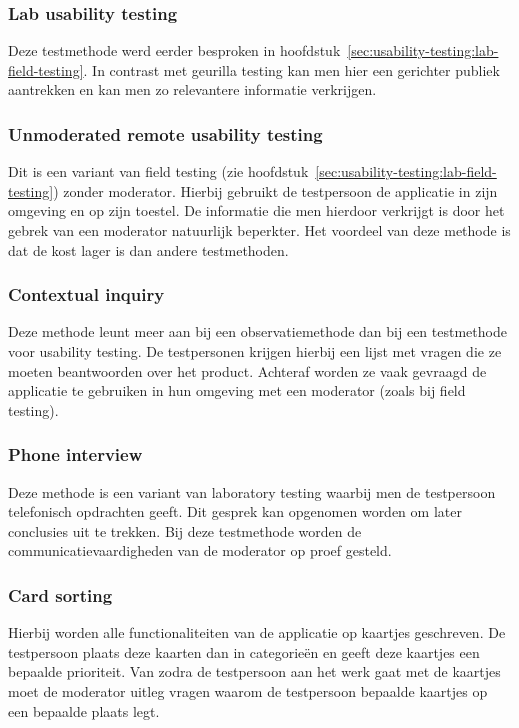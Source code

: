\subsubsection{Lab usability testing}
\label{sec:usability-testing:testmethoden:lab}

Deze testmethode werd eerder besproken in hoofdstuk~\ref{sec:usability-testing:lab-field-testing}. In contrast met geurilla testing kan men hier een gerichter publiek aantrekken en kan men zo relevantere informatie verkrijgen.

\subsubsection{Unmoderated remote usability testing}
\label{sec:usability-testing:testmethoden:unmoderated-remote}

Dit is een variant van field testing (zie hoofdstuk~\ref{sec:usability-testing:lab-field-testing}) zonder moderator. Hierbij gebruikt de testpersoon de applicatie in zijn omgeving en op zijn toestel. De informatie die men hierdoor verkrijgt is door het gebrek van een moderator natuurlijk beperkter. Het voordeel van deze methode is dat de kost lager is dan andere testmethoden.

\subsubsection{Contextual inquiry}
\label{sec:usability-testing:testmethoden:contextual-inquiry}

Deze methode leunt meer aan bij een observatiemethode dan bij een testmethode voor usability testing. De testpersonen krijgen hierbij een lijst met vragen die ze moeten beantwoorden over het product. Achteraf worden ze vaak gevraagd de applicatie te gebruiken in hun omgeving met een moderator (zoals bij field testing).

\subsubsection{Phone interview}
\label{sec:usability-testing:testmethoden:phone}

Deze methode is een variant van laboratory testing waarbij men de testpersoon telefonisch opdrachten geeft. Dit gesprek kan opgenomen worden om later conclusies uit te trekken. Bij deze testmethode worden de communicatievaardigheden van de moderator op proef gesteld.

\subsubsection{Card sorting}
\label{sec:usability-testing:testmethoden:card-sorting}

Hierbij worden alle functionaliteiten van de applicatie op kaartjes geschreven. De testpersoon plaats deze kaarten dan in categorieën en geeft deze kaartjes een bepaalde prioriteit. Van zodra de testpersoon aan het werk gaat met de kaartjes moet de moderator uitleg vragen waarom de testpersoon bepaalde kaartjes op een bepaalde plaats legt. 

